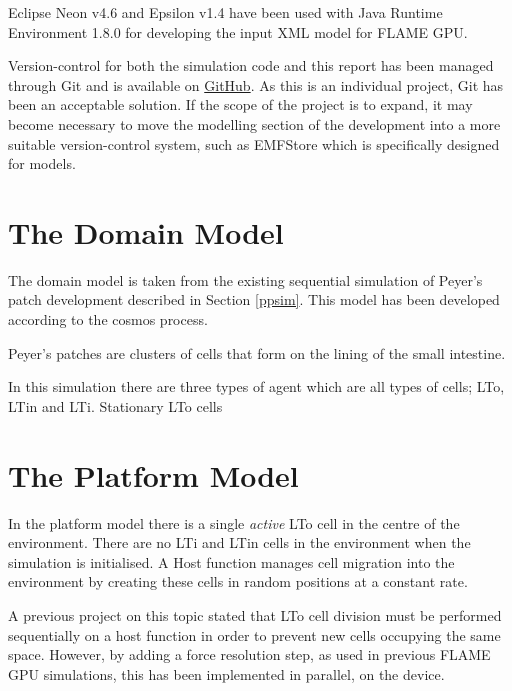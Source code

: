 \documentclass{UoYCSproject}
\begin{document}
Eclipse Neon v4.6 and Epsilon v1.4 have been used with Java Runtime Environment 1.8.0 for developing the input XML model for \gls{FLAME GPU}.

Version-control for both the simulation code and this report has been managed through Git and is available on \href{https://github.com/oliver-binns/PRIY.git}{GitHub}. As this is an individual project, Git has been an acceptable solution. If the scope of the project is to expand, it may become necessary to move the modelling section of the development into a more suitable version-control system, such as EMFStore\cite{emf_store} which is specifically designed for models.

\section{The Domain Model}
The domain model is taken from the existing sequential simulation of Peyer's patch development described in Section \ref{ppsim}.
This model has been developed according to the \acrshort{cosmos} process\cite{cosmos}.

Peyer's patches are clusters of cells that form on the lining of the small intestine.

In this simulation there are three types of agent which are all types of cells; \gls{LTo}, \gls{LTin} and \gls{LTi}.
Stationary \gls{LTo} cells 

\section{The Platform Model}
In the platform model there is a single \textit{active} \gls{LTo} cell in the centre of the environment.
There are no LTi and LTin cells in the environment when the simulation is initialised.
A \gls{Host} function manages cell migration into the environment by creating these cells in random positions at a constant rate.

A previous project on this topic stated that LTo cell division must be performed sequentially on a host function in order to prevent new cells occupying the same space\cite{phil_diss}.
However, by adding a force resolution step, as used in previous \gls{FLAME GPU} simulations\cite{flame_keratinocyte}, this has been implemented in parallel, on the device.
\end{document}
